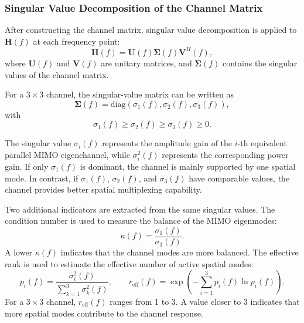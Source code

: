 \documentclass[10pt]{article}
\begin{document}
\subsubsection{Singular Value Decomposition of the Channel Matrix}

After constructing the channel matrix, singular value decomposition is applied to \(\mathbf{H}(f)\) at each frequency point:
\begin{equation}
    \mathbf{H}(f)
    =
    \mathbf{U}(f)
    \boldsymbol{\Sigma}(f)
    \mathbf{V}^{H}(f),
\end{equation}
where \(\mathbf{U}(f)\) and \(\mathbf{V}(f)\) are unitary matrices, and \(\boldsymbol{\Sigma}(f)\) contains the singular values of the channel matrix.

For a \(3 \times 3\) channel, the singular-value matrix can be written as
\begin{equation}
    \boldsymbol{\Sigma}(f)
    =
    \mathrm{diag}
    \left(
    \sigma_1(f),
    \sigma_2(f),
    \sigma_3(f)
    \right),
\end{equation}
with
\begin{equation}
    \sigma_1(f) \geq \sigma_2(f) \geq \sigma_3(f) \geq 0.
\end{equation}

The singular value \(\sigma_i(f)\) represents the amplitude gain of the \(i\)-th equivalent parallel MIMO eigenchannel, while \(\sigma_i^2(f)\) represents the corresponding power gain. 
If only \(\sigma_1(f)\) is dominant, the channel is mainly supported by one spatial mode. 
In contrast, if \(\sigma_1(f)\), \(\sigma_2(f)\), and \(\sigma_3(f)\) have comparable values, the channel provides better spatial multiplexing capability.

Two additional indicators are extracted from the same singular values. The condition number is used
to measure the balance of the MIMO eigenmodes:
\begin{equation}
    \kappa(f)
    =
    \frac{\sigma_1(f)}
    {\sigma_3(f)}.
\end{equation}
A lower \(\kappa(f)\) indicates that the channel modes are more balanced. The effective rank is used
to estimate the effective number of active spatial modes:
\begin{equation}
    p_i(f)
    =
    \frac{\sigma_i^2(f)}
    {\sum_{k=1}^{3}\sigma_k^2(f)},
    \qquad
    r_{\mathrm{eff}}(f)
    =
    \exp
    \left(
    -\sum_{i=1}^{3}p_i(f)\ln p_i(f)
    \right).
\end{equation}
For a \(3\times3\) channel, \(r_{\mathrm{eff}}(f)\) ranges from 1 to 3. A value closer to 3 indicates
that more spatial modes contribute to the channel response.
\end{document}
